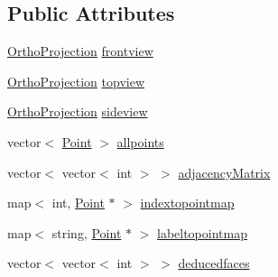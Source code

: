 \subsection*{Public Attributes}
\begin{DoxyCompactItemize}
\item 
\hyperlink{class_ortho_projection}{Ortho\+Projection} \hyperlink{class_projection2_d_a1eb4d010190b1bd62bf0f9c4e4afc88a}{frontview}
\item 
\hyperlink{class_ortho_projection}{Ortho\+Projection} \hyperlink{class_projection2_d_a90079954379a766f60ba01ad393327ab}{topview}
\item 
\hyperlink{class_ortho_projection}{Ortho\+Projection} \hyperlink{class_projection2_d_a82c9e3f197b07ffe9a10f59de60edbee}{sideview}
\item 
vector$<$ \hyperlink{class_point}{Point} $>$ \hyperlink{class_projection2_d_aacafd767e5289005e7ec5d48c791d02f}{allpoints}
\item 
vector$<$ vector$<$ int $>$ $>$ \hyperlink{class_projection2_d_a0a4be368b0a7233a1aa93efe17c7314e}{adjacency\+Matrix}
\item 
map$<$ int, \hyperlink{class_point}{Point} $\ast$ $>$ \hyperlink{class_projection2_d_a08675aad4022218dc78dd54187be18a9}{indextopointmap}
\item 
map$<$ string, \hyperlink{class_point}{Point} $\ast$ $>$ \hyperlink{class_projection2_d_a0afd92ccd321bc86e6e019b4bec99fc8}{labeltopointmap}
\item 
vector$<$ vector$<$ int $>$ $>$ \hyperlink{class_projection2_d_ab61981ca6001560343c1e378c334866a}{deducedfaces}
\end{DoxyCompactItemize}
